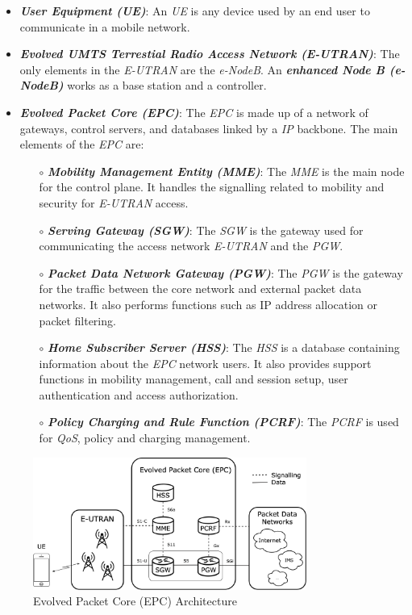 \begin{itemize}
  \item \textbf{\textit{User Equipment (UE)}}: An \textit{UE} is any device used by an end user
  to communicate in a mobile network.
  \item \textbf{\textit{Evolved UMTS Terrestial Radio Access Network (E-UTRAN)}}: The only elements
  in the \textit{E-UTRAN} are the \textit{e-NodeB}. An \textit{\textbf{enhanced Node B (e-NodeB)}} works as a base station
  and a controller.
  \item \textbf{\textit{Evolved Packet Core (EPC)}}: The \textit{EPC} is made up of a network of gateways, 
  control servers, and databases linked by a \textit{IP} backbone. The main elements of the \textit{EPC}
  are:
  \begin{itemize}
    \item[$\circ$] \textit{\textbf{Mobility Management Entity (MME)}}: The \textit{MME} is 
    the main node for the control plane. It handles the signalling related to 
    mobility and security for \textit{E-UTRAN} access.
    \item[$\circ$] \textit{\textbf{Serving Gateway (SGW)}}: The \textit{SGW} is the gateway 
    used for communicating the access network \textit{E-UTRAN} and the \textit{PGW}.
    \item[$\circ$] \textit{\textbf{Packet Data Network Gateway (PGW)}}: The \textit{PGW} is the gateway
    for the traffic between the core network and external packet data networks. It also performs
    functions such as IP address allocation or packet filtering. 
    \item[$\circ$] \textit{\textbf{Home Subscriber Server (HSS)}}: The \textit{HSS} is a database 
    containing information about the \textit{EPC} network users.  It also provides support 
    functions in mobility management, call and session setup, user authentication and access authorization.
    \item[$\circ$] \textit{\textbf{Policy Charging and Rule Function (PCRF)}}: The \textit{PCRF} is used
    for \textit{QoS}, policy and charging management. 
  \end{itemize}
\end{itemize}

\begin{figure}[h]
  \centering
  \includegraphics[width=0.8\textwidth]{img/epc.png}
  \caption{Evolved Packet Core (EPC) Architecture}
  \label{fig:epc}
\end{figure}

